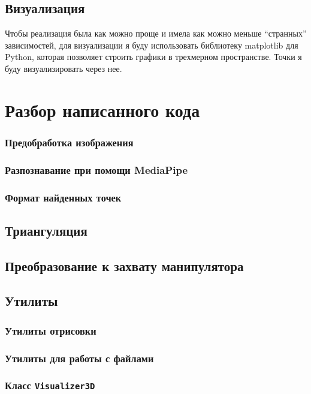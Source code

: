 \documentclass[12pt, a4paper]{article}
\begin{document}
\subsection{Визуализация}
Чтобы реализация была как можно проще и имела как можно меньше ``странных''
зависимостей, для визуализации я буду использовать библиотеку matplotlib для
Python, которая позволяет строить графики в трехмерном пространстве. Точки я
буду визуализировать через нее.

\section{Разбор написанного кода}

\subsubsection{Предобработка изображения}
\subsubsection{Разпознавание при помощи MediaPipe}
\subsubsection{Формат найденных точек}

\subsection{Триангуляция}

\subsection{Преобразование к захвату манипулятора}

\subsection{Утилиты}
\subsubsection{Утилиты отрисовки}
\subsubsection{Утилиты для работы с файлами}
\subsubsection{Класс \texttt{Visualizer3D}}
\end{document}
